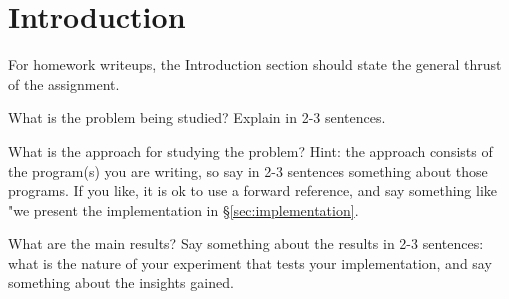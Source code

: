 \section{Introduction}

For homework writeups, the Introduction section should state the general thrust of the assignment.

What is the problem being studied? Explain in 2-3 sentences.

What is the approach for studying the problem? Hint: the approach consists of the program(s) you are writing, so say in 2-3 sentences something about those programs. If you like, it is ok to use a forward reference, and say something like "we present the implementation in \S\ref{sec:implementation}. 

What are the main results? Say something about the results in 2-3 sentences: what is the nature of your experiment that tests your implementation, and say something about the insights gained. 

